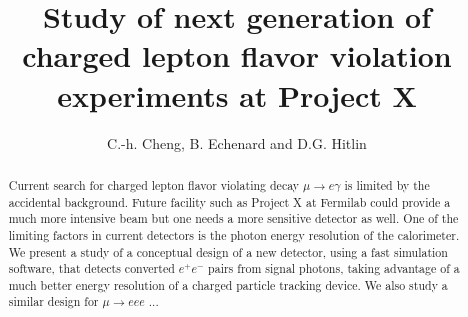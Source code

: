 \documentclass[12pt]{article}
\begin{document}

\title{Study of next generation of charged lepton flavor violation experiments at Project X}

\author{C.-h. Cheng, B. Echenard and D.G. Hitlin}

\maketitle

\begin{abstract}
Current search for charged lepton flavor violating decay $\mu\to e \gamma$ is 
limited by the accidental background. Future facility such as Project X at 
Fermilab could provide a much more intensive beam but one needs a more 
sensitive detector as well. One of the limiting factors in current detectors
is the photon energy resolution of the calorimeter. We present a study of a
conceptual design of a new detector, using a fast simulation software, that
detects converted $e^+e^-$ pairs from signal photons, taking advantage of a much
better energy resolution of a charged particle tracking device. We also study
a similar design for $\mu\to eee$ ...
\end{abstract}








\end{document}
